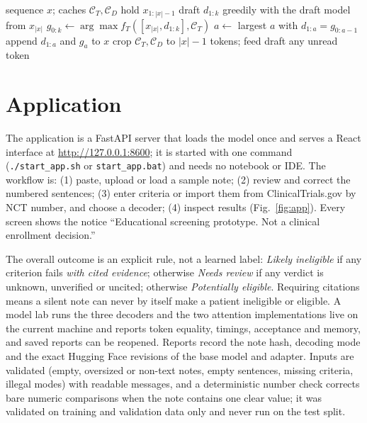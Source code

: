 \documentclass[conference]{IEEEtran}
\newcommand{\code}[1]{\texttt{\small #1}}
\begin{document}
\begin{algorithm}[t]
\caption{One round of greedy speculative decoding}\label{alg:spec}
\begin{algorithmic}[1]
\Require sequence $x$; caches $\mathcal{C}_T,\mathcal{C}_D$ hold $x_{1:|x|-1}$
\State draft $d_{1:k}$ greedily with the draft model from $x_{|x|}$
\State $g_{0:k}\gets\arg\max f_T([x_{|x|},d_{1:k}],\mathcal{C}_T)$ 
\State $a\gets$ largest $a$ with $d_{1:a}=g_{0:a-1}$
\State append $d_{1:a}$ and $g_a$ to $x$ 
\State crop $\mathcal{C}_T,\mathcal{C}_D$ to $|x|-1$ tokens; feed draft any unread token
\end{algorithmic}
\end{algorithm}

\section{Application}\label{sec:app}
The application is a FastAPI server that loads the model once and serves a React interface at \url{http://127.0.0.1:8600}; it is started with one command (\code{./start\_app.sh} or \code{start\_app.bat}) and needs no notebook or IDE. The workflow is: (1) paste, upload or load a sample note; (2) review and correct the numbered sentences; (3) enter criteria or import them from ClinicalTrials.gov by NCT number, and choose a decoder; (4) inspect results (Fig.~\ref{fig:app}). Every screen shows the notice ``Educational screening prototype. Not a clinical enrollment decision.''

The overall outcome is an explicit rule, not a learned label: \emph{Likely ineligible} if any criterion fails \emph{with cited evidence}; otherwise \emph{Needs review} if any verdict is unknown, unverified or uncited; otherwise \emph{Potentially eligible}. Requiring citations means a silent note can never by itself make a patient ineligible or eligible. A model lab runs the three decoders and the two attention implementations live on the current machine and reports token equality, timings, acceptance and memory, and saved reports can be reopened. Reports record the note hash, decoding mode and the exact Hugging Face revisions of the base model and adapter. Inputs are validated (empty, oversized or non-text notes, empty sentences, missing criteria, illegal modes) with readable messages, and a deterministic number check corrects bare numeric comparisons when the note contains one clear value; it was validated on training and validation data only and never run on the test split.
\end{document}
